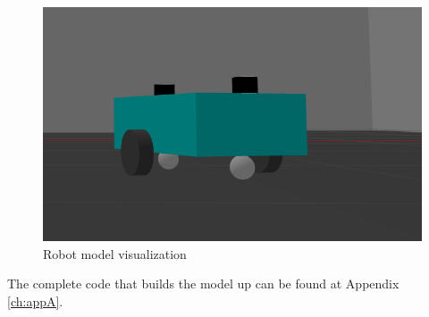 
\begin{figure}[H]
\centering
\includegraphics[scale = 0.5]{Images/Chapter 5/sim_3.png}
\caption{Robot model visualization}
\end{figure}

The complete code that builds the model up can be found at Appendix \ref{ch:appA}.
